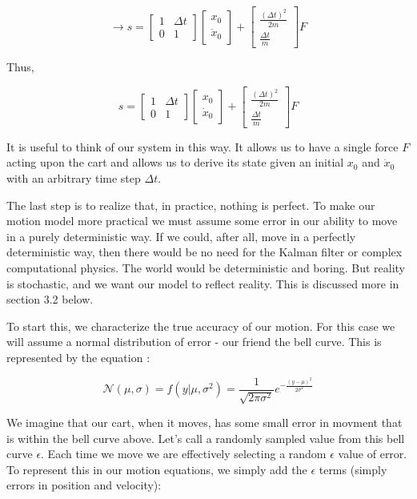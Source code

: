 \documentclass[11pt]{article}
\begin{document}
\[
\rightarrow
s =
\begin{bmatrix}
  1 & \Delta{t}\\
  0 & 1
\end{bmatrix}
\begin{bmatrix}
  x_0\\
  \dot{x}_0
\end{bmatrix}
+
\begin{bmatrix}
  \frac{(\Delta t)^2}{2m}\\
   \frac{\Delta t}{m}
\end{bmatrix}
F
\]


Thus,

\[
s
=
\begin{bmatrix}
  1 & \Delta t\\
  0 & 1
\end{bmatrix}
\begin{bmatrix}
  x_0\\
  \dot{x}_0
\end{bmatrix}
+
\begin{bmatrix}
  \frac{(\Delta t)^2}{2m}\\
  \frac{\Delta t}{m}
\end{bmatrix}
F
\]

It is useful to think of our system in this way. It allows us to have a single force $F$
acting upon the cart and allows us to derive its state given an initial $x_0$ and $\dot{x}_0$
with an arbitrary time step $\Delta t$.

The last step is to realize that, in practice, nothing is perfect. To make our motion
model more practical we must assume some error in our ability to move in a purely
deterministic way. If we could, after all, move in a perfectly deterministic way,
then there would be no need for the Kalman filter or complex computational physics.
The world would be deterministic and boring. But reality is stochastic, and we want
our model to reflect reality. This is discussed more in section 3.2 below.

To start this, we characterize the true accuracy of our motion. For this case we will
assume a normal distribution of error - our friend the bell curve. This is represented
by the equation \cite{feller1}:

\[
\mathcal{N}(\mu, \sigma) = f (y | \mu , \sigma^2) = \frac{1}{\sqrt{2 \pi \sigma^2}}e^{-\frac{(y - \mu)^2}{2 \sigma^2}}
\]

We imagine that our cart, when it moves, has some small error in movment that is within
the bell curve above. Let's call a randomly sampled value from this bell curve $\epsilon$.
Each time we move we are effectively selecting a random $\epsilon$ value of error.
To represent this in our motion equations, we simply add the $\epsilon$ terms (simply errors in position and velocity):
\end{document}

